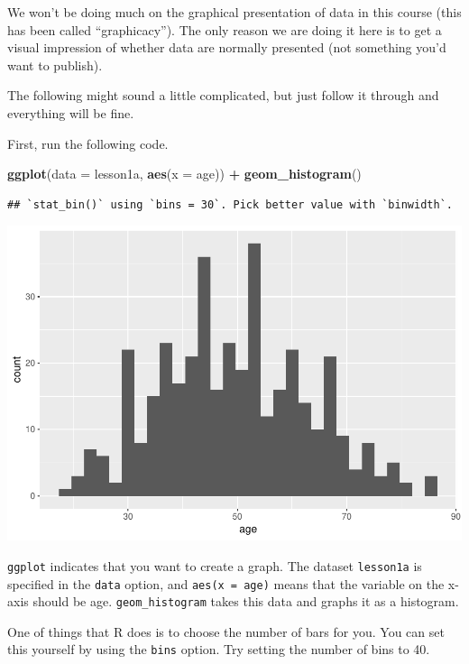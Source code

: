 \documentclass[]{book}
\newenvironment{Shaded}{\begin{snugshade}}{\end{snugshade}}
\newcommand{\DataTypeTok}[1]{\textcolor[rgb]{0.13,0.29,0.53}{#1}}
\newcommand{\KeywordTok}[1]{\textcolor[rgb]{0.13,0.29,0.53}{\textbf{#1}}}
\newcommand{\NormalTok}[1]{#1}
\newcommand{\OperatorTok}[1]{\textcolor[rgb]{0.81,0.36,0.00}{\textbf{#1}}}
\newcommand{\StringTok}[1]{\textcolor[rgb]{0.31,0.60,0.02}{#1}}
\begin{document}
We won't be doing much on the graphical presentation of data in this course (this has been called ``graphicacy''). The only reason we are doing it here is to get a visual impression of whether data are normally presented (not something you'd want to publish).

The following might sound a little complicated, but just follow it through and everything will be fine.

First, run the following code.

\begin{Shaded}
\begin{Highlighting}[]
\KeywordTok{ggplot}\NormalTok{(}\DataTypeTok{data =}\NormalTok{ lesson1a,}
       \KeywordTok{aes}\NormalTok{(}\DataTypeTok{x =}\NormalTok{ age)) }\OperatorTok{+}
\StringTok{  }\KeywordTok{geom_histogram}\NormalTok{()}
\end{Highlighting}
\end{Shaded}

\begin{verbatim}
## `stat_bin()` using `bins = 30`. Pick better value with `binwidth`.
\end{verbatim}

\includegraphics{02-week2_files/figure-latex/section2m-1.pdf}

\texttt{ggplot} indicates that you want to create a graph. The dataset \texttt{lesson1a} is specified in the \texttt{data} option, and \texttt{aes(x\ =\ age)} means that the variable on the x-axis should be age. \texttt{geom\_histogram} takes this data and graphs it as a histogram.

One of things that R does is to choose the number of bars for you. You can set this yourself by using the \texttt{bins} option. Try setting the number of bins to 40.
\end{document}

